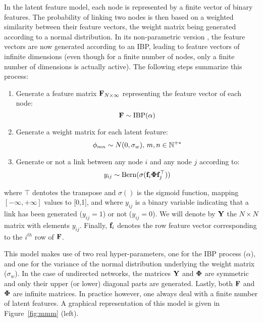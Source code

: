 In the latent feature model, each node is represented by a finite vector of binary features. The probability of linking two nodes is then based on a weighted similarity between their feature vectors, the weight matrix being generated according to a normal distribution. In its non-parametric version \ifm, the feature vectors are now generated according to an IBP, leading to feature vectors of infinite dimensions (even though for a finite number of nodes, only a finite number of dimensions is actually active). The following steps summarize this process:~\\
%
\begin{enumerate}
    \item Generate a feature matrix $\mathbf{F}_{N \times \infty}$ representing the feature vector of each node: \[\mathbf{F} \sim \mathrm{IBP}(\alpha)\]
\item Generate a weight matrix for each latent feature:\\
    \[\mathbf{\phi}_{mn} \sim N(0, \sigma_w), \, m,n \in \mathbb{N}^{+*}\]
\item Generate or not a link between any node $i$ and any node $j$ according to: 
%
\begin{equation*}
y_{ij} \sim \mathrm{Bern}(\sigma(\mathbf{f}_{i} \mathbf{\Phi} \mathbf{f}_{j}^\top))
\end{equation*}
\end{enumerate}
%
where $\top$ dentotes the transpose and  $\sigma()$ is the sigmoid function, mapping $[-\infty, +\infty]$ values to [0,1], and where $y_{ij}$ is a binary variable indicating that a link has been generated ($y_{ij}=1$) or not ($y_{ij}=0$). We will denote by $\mathbf{Y}$ the $N \times N$ matrix with elements $y_{ij}$. Finally, $\mathbf{f}_{i}$ denotes the row feature vector corresponding to the $i^{th}$ row of $\mathbf{F}$.

This model makes use of two real hyper-parameters, one for the IBP process ($\alpha$), and one for the variance of the normal distribution underlying the weight matrix ($\sigma_w$). In the case of undirected networks, the matrices $\mathbf{Y}$ and $\mathbf{\Phi}$ are symmetric and only their upper (or lower) diagonal parts are generated. Lastly, both $\mathbf{F}$ and $\mathbf{\Phi}$ are infinite matrices. In practice however, one always deal with a finite number of latent features. A graphical representation of this model is given in Figure~\ref{fig:mmm} (left).~\\



